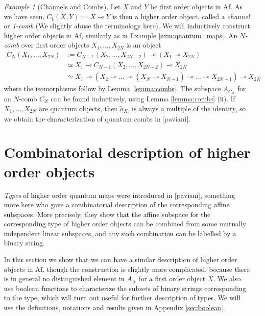\documentclass[12pt]{article}
\theoremstyle{definition}
\theoremstyle{remark}
\newtheorem{exm}{Example}
\def \Af{\mathrm{Af}}
\begin{document}
\begin{exm}[Channels and Combs] Let  $X$ and $Y$ be first order objects in $\Af$. As we
have seen, $C_1(X,Y):= X\multimap Y$ is then a higher order object, called a {\em channel} or {\em
1-comb} (We slightly  abuse
the terminology here).  We will inductively construct higher order objects in $\Af$,
similarly as in Example \ref{exm:quantum_maps}. An
{\em $N$-comb} over first order objects $X_1,\dots,X_{2N}$ is an object
\begin{align*}
C_N(X_1,\dots,X_{2N})&:=C_{N-1}(X_2,\dots,X_{2N-2})\multimap (X_1\multimap X_{2N})\\
&\simeq X_{1}\multimap C_{N-1}(X_2,\dots,X_{2N-2})\multimap X_{2N}\\
&\simeq X_1\multimap(X_2\multimap\dots \multimap (X_{N}\multimap
X_{N+1})\multimap \dots \multimap X_{2N-1})  \multimap X_{2N}
\end{align*}
where the isomorphisms follow by Lemma \ref{lemma:combs}. The subspace $A_{C_N}$ for an
$N$-comb $C_N$ can be found inductively, using Lemma \ref{lemma:combs} (ii).
If $X_1,\dots, X_{2N}$ are quantum objects, then $\tilde a_{X_i}$ is always a multiple of
the identity, so we obtain the characterization of quantum combs  in [paviani].



\end{exm}




\section{Combinatorial description of higher order objects}


{\em Types} of higher order quantum maps were introduced in [paviani],{\color{red}
something more here} who gave a combinatorial
description of the corresponding affine subspaces. More precisely, they show that the
affine subspace for the corresponding type of higher order objects can be combined from
some mutually independent {\color{red} linear subspaces}, and any such combination can be
labelled by a binary string.

In this section we show that we can have a similar description of higher order objects in
$\Af$, though the construction is slightly more complicated, because there is in general
no distinguished element in $A_X$ for a first order object $X$. We also use boolean
functions to characterize the  subsets of binary strings corresponding to the type, which will turn out useful for further description of
 types.  We will use the definitions, notations and results given in Appendix
\ref{sec:boolean}.
\end{document}
